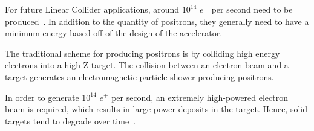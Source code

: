 \documentclass[%
reprint,
nofootinbib,
amsmath, amssymb,
aps,
floatfix,
]{revtex4-2}
\begin{document}
For future Linear Collider applications, around $10^{14}$ $e^+$ per second need to be produced~\cite{Seimiya2015}.
In addition to the quantity of positrons, they generally need to have a minimum energy based off
of the design of the accelerator.

The traditional scheme for producing positrons is by colliding high energy electrons into a high-Z target.
The collision between an electron beam and a target generates an electromagnetic particle shower
producing positrons.

In order to generate $10^{14}$ $e^+$ per second, an extremely high-powered electron beam is required,
which results in large power deposits in the target. 
Hence, solid targets tend to degrade over time~\cite{Bharadwaj2001}.

\end{document}
